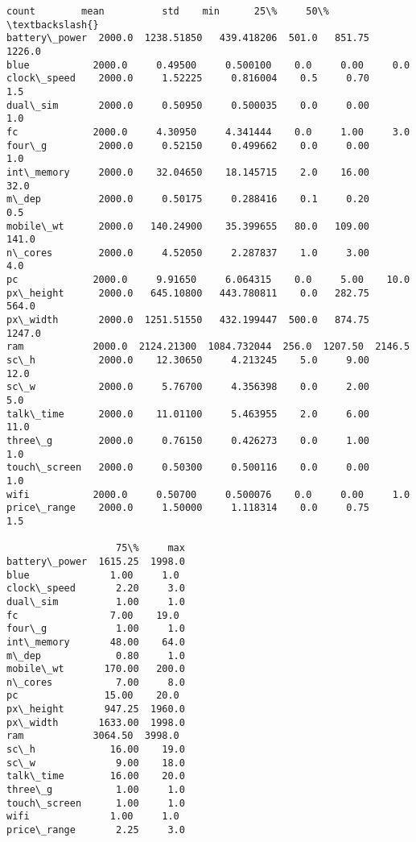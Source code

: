 \documentclass[12pt,a4paper,table]{article}
\makeatletter
\newcommand{\boxspacing}{\kern\kvtcb@left@rule\kern\kvtcb@boxsep}
\newcommand{\prompt}[4]{
        {\ttfamily\llap{{\color{#2}[#3]:\hspace{3pt}#4}}\vspace{-\baselineskip}}
    }
\makeatother
\begin{document}
            \begin{tcolorbox}[breakable, size=fbox, boxrule=.5pt, pad at break*=1mm, opacityfill=0]
\prompt{Out}{outcolor}{5}{\boxspacing}
\begin{Verbatim}[commandchars=\\\{\}]
                count        mean          std    min      25\%     50\%  \textbackslash{}
battery\_power  2000.0  1238.51850   439.418206  501.0   851.75  1226.0
blue           2000.0     0.49500     0.500100    0.0     0.00     0.0
clock\_speed    2000.0     1.52225     0.816004    0.5     0.70     1.5
dual\_sim       2000.0     0.50950     0.500035    0.0     0.00     1.0
fc             2000.0     4.30950     4.341444    0.0     1.00     3.0
four\_g         2000.0     0.52150     0.499662    0.0     0.00     1.0
int\_memory     2000.0    32.04650    18.145715    2.0    16.00    32.0
m\_dep          2000.0     0.50175     0.288416    0.1     0.20     0.5
mobile\_wt      2000.0   140.24900    35.399655   80.0   109.00   141.0
n\_cores        2000.0     4.52050     2.287837    1.0     3.00     4.0
pc             2000.0     9.91650     6.064315    0.0     5.00    10.0
px\_height      2000.0   645.10800   443.780811    0.0   282.75   564.0
px\_width       2000.0  1251.51550   432.199447  500.0   874.75  1247.0
ram            2000.0  2124.21300  1084.732044  256.0  1207.50  2146.5
sc\_h           2000.0    12.30650     4.213245    5.0     9.00    12.0
sc\_w           2000.0     5.76700     4.356398    0.0     2.00     5.0
talk\_time      2000.0    11.01100     5.463955    2.0     6.00    11.0
three\_g        2000.0     0.76150     0.426273    0.0     1.00     1.0
touch\_screen   2000.0     0.50300     0.500116    0.0     0.00     1.0
wifi           2000.0     0.50700     0.500076    0.0     0.00     1.0
price\_range    2000.0     1.50000     1.118314    0.0     0.75     1.5

                   75\%     max
battery\_power  1615.25  1998.0
blue              1.00     1.0
clock\_speed       2.20     3.0
dual\_sim          1.00     1.0
fc                7.00    19.0
four\_g            1.00     1.0
int\_memory       48.00    64.0
m\_dep             0.80     1.0
mobile\_wt       170.00   200.0
n\_cores           7.00     8.0
pc               15.00    20.0
px\_height       947.25  1960.0
px\_width       1633.00  1998.0
ram            3064.50  3998.0
sc\_h             16.00    19.0
sc\_w              9.00    18.0
talk\_time        16.00    20.0
three\_g           1.00     1.0
touch\_screen      1.00     1.0
wifi              1.00     1.0
price\_range       2.25     3.0
\end{Verbatim}
\end{tcolorbox}
        
\end{document}
